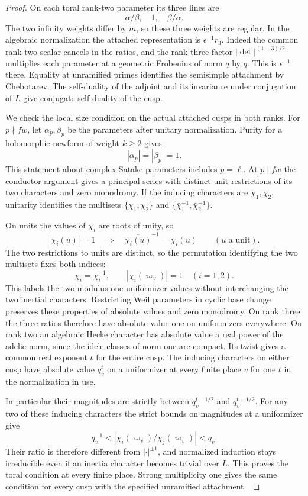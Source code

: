\begin{proof}
On each toral
rank-two parameter its three lines are
\[
                  \alpha/\beta,\quad 1,\quad\beta/\alpha .
\]
The two infinity weights differ by \(m\), so these three weights
are regular. In the algebraic normalization the attached
representation is \(\epsilon^{-1}r_3\). Indeed the common
rank-two scalar cancels in the ratios, and the rank-three
factor \(|\det|^{(1-3)/2}\) multiplies each parameter at a
geometric Frobenius of norm \(q\) by \(q\). This is
\(\epsilon^{-1}\) there. Equality at unramified primes identifies
the semisimple attachment by Chebotarev. The self-duality of
the adjoint and its invariance under conjugation of \(L\)
give conjugate self-duality of the cusp. \cite{gelbart-jacquet}

We check the local size condition on the actual attached cusps
in both ranks. For \(p\nmid fw\), let \(\alpha_p,\beta_p\) be the parameters after unitary normalization. Purity for a holomorphic newform of weight \(k\ge2\) gives
\[
 |\alpha_p|=|\beta_p|=1 .
\] This statement about
complex Satake parameters includes \(p=\ell\). At \(p\mid fw\)
the conductor argument gives a principal series with distinct
unit restrictions of its two characters and zero monodromy.
If the inducing characters are \(\chi_1,\chi_2\),
unitarity identifies the multisets \(\{\chi_1,\chi_2\}\)
and \(\{\bar\chi_1^{-1},\bar\chi_2^{-1}\}\).

On units the values of \(\chi_i\) are roots of unity, so
\[
 |\chi_i(u)|=1\quad\Longrightarrow\quad\overline{\chi_i(u)}^{-1}=\chi_i(u)\qquad(u\text{ a unit}).
\] The two restrictions
to units are distinct, so the permutation identifying the two
multisets fixes both indices:
\[
 \chi_i=\bar\chi_i^{-1},\qquad
               |\chi_i(\varpi_v)|=1\quad (i=1,2).
\]
This labels the two modulus-one uniformizer values without
interchanging the two inertial characters. Restricting Weil parameters
in cyclic base change preserves these properties of absolute
values and zero monodromy. On rank three the three ratios
therefore have absolute value one on uniformizers everywhere.
On rank two an algebraic Hecke character has absolute value
a real power of the adelic norm, since the idele classes of norm
one are compact. Its twist gives a common real exponent \(t\)
for the entire cusp. The inducing characters on either cusp
have absolute value \(q_v^t\) on a uniformizer at every finite
place \(v\) for one \(t\) in the normalization in use.

In
particular their magnitudes are strictly between
\(q_v^{t-1/2}\) and \(q_v^{t+1/2}\). For any two of these inducing characters the strict bounds on magnitudes at a uniformizer give
\[
 q_v^{-1}<|\chi_i(\varpi_v)/\chi_j(\varpi_v)|<q_v.
\]
Their ratio is therefore different from \(|\cdot|^{\pm1}\), and normalized induction stays irreducible even if an inertia character becomes trivial over \(L\). This proves the toral condition at every
finite place. Strong multiplicity one gives the same condition
for every cusp with the specified unramified attachment.
\cite{deligne-weil,carayol-local,bernstein-zelevinsky,arthur-clozel,gelbart-jacquet}


\end{proof}
